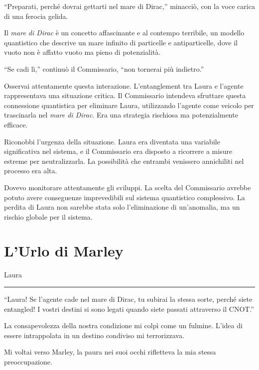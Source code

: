 \enquote{Preparati, perché dovrai gettarti nel mare di Dirac,} minacciò, con la  voce carica di una ferocia gelida.

Il \textit{mare di Dirac} è un concetto affascinante e al contempo terribile, un modello quantistico che descrive un mare infinito di particelle e antiparticelle, dove il vuoto non è affatto vuoto ma pieno di potenzialità.



\enquote{Se cadi lì,} continuò il Commissario, \enquote{non tornerai più indietro.}


Osservai attentamente questa interazione. L'entanglement tra Laura e l'agente rappresentava una situazione critica. Il Commissario intendeva sfruttare questa connessione quantistica per eliminare Laura, utilizzando l'agente come veicolo per trascinarla nel \textit{mare di Dirac}. Era una strategia rischiosa ma potenzialmente efficace.

Riconobbi l'urgenza della situazione. Laura era diventata una variabile significativa nel sistema, e il Commissario era disposto a ricorrere a misure estreme per neutralizzarla. La possibilità che entrambi venissero annichiliti nel processo era alta.

Dovevo monitorare attentamente gli sviluppi. La scelta del Commissario avrebbe potuto avere conseguenze imprevedibili sul sistema quantistico complessivo. La perdita di Laura non sarebbe stata solo l'eliminazione di un'anomalia, ma un rischio globale per il sistema.
\section{L'Urlo di Marley}
\vspace{1em}
\begin{center}Laura\end{center}
\hrule
\vspace{1em}


\begin{dialogue}
 \enquote{Laura! Se l'agente cade nel mare di Dirac, tu subirai la stessa sorte, perché siete entangled! I vostri destini si sono legati quando siete passati attraverso il CNOT.}
\end{dialogue}

La consapevolezza della nostra condizione mi colpì come un fulmine. L'idea di essere intrappolata in un destino condiviso mi terrorizzava.

Mi voltai verso Marley, la paura nei suoi occhi rifletteva la mia stessa preoccupazione.

